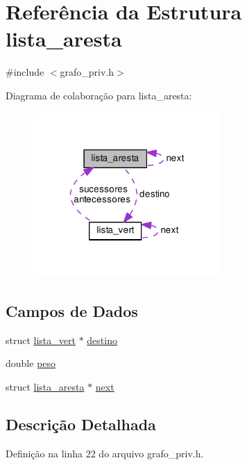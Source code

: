 \hypertarget{structlista__aresta}{}\section{Referência da Estrutura lista\+\_\+aresta}
\label{structlista__aresta}


{\ttfamily \#include $<$grafo\+\_\+priv.\+h$>$}



Diagrama de colaboração para lista\+\_\+aresta\+:\nopagebreak
\begin{figure}[H]
\begin{center}
\leavevmode
\includegraphics[width=203pt]{structlista__aresta__coll__graph}
\end{center}
\end{figure}
\subsection*{Campos de Dados}
\begin{DoxyCompactItemize}
\item 
struct \hyperlink{structlista__vert}{lista\+\_\+vert} $\ast$ \hyperlink{structlista__aresta_a324d065ab2fc1df5d59128027c4c8a5a}{destino}
\item 
double \hyperlink{structlista__aresta_af006bc606a812d12d13d35a4f00c0e6c}{peso}
\item 
struct \hyperlink{structlista__aresta}{lista\+\_\+aresta} $\ast$ \hyperlink{structlista__aresta_a55d9a8d5fcc901c1d8802239735b4af7}{next}
\end{DoxyCompactItemize}


\subsection{Descrição Detalhada}


Definição na linha 22 do arquivo grafo\+\_\+priv.\+h.



